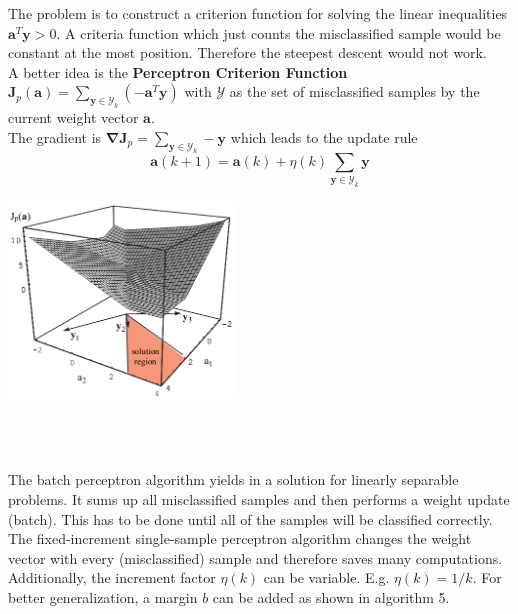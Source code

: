   \begin{minipage}{12cm}
    The problem is to construct a criterion function for solving the linear inequalities $\bm a^T \bm y > 0$. 
    A criteria function which just counts the misclassified sample would be constant at the most position. 
    Therefore the steepest descent would not work. \\
    
    A better idea is the \textbf{Perceptron Criterion Function}
    $\bm J_p(\bm a) = \sum\limits_{\bm y \in \mathcal{Y}_k} (-\bm a^T \bm y)$  with $\mathcal{Y}$ as the set
    of misclassified samples by the current weight vector $\bm a$.\\
    The gradient is $\bm {\nabla J}_p = \sum\limits_{\bm y\in \mathcal{Y}_k} -\bm y$
    which leads to the update rule 
    \begin{equation*}
        \bm a(k+1) = \bm a(k) + \eta(k) \sum\limits_{\bm y\in \mathcal{Y}_k} \bm y
    \end{equation*}
       
   	\end{minipage}
    \hspace{8mm} 
    \begin{minipage}{6cm}
    	 \includegraphics[width=6cm]{./images/perceptron.png}
    \end{minipage} \\
    
    \begin{multicols}{3}
        \\
        The batch perceptron algorithm yields in a solution for linearly separable problems. 
        It sums up all misclassified samples and then performs a weight update (batch). 
        This has to be done until all of the samples will be classified correctly.  
    \vfill
    \columnbreak
        \\
        The fixed-increment single-sample perceptron algorithm changes the weight vector
        with every (misclassified) sample and therefore saves many computations.
    \vfill
    \columnbreak
        \\
        Additionally, the increment factor $\eta(k)$ can be variable. E.g. $\eta(k)=1/k$. For better 
        generalization, a margin $b$ can be added as shown in algorithm 5.  
    \end{multicols}

